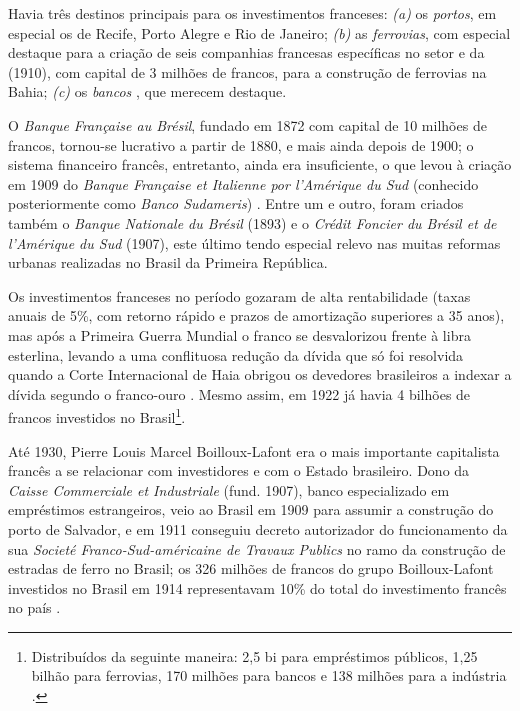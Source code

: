 Havia três destinos principais para os investimentos franceses: \textit{(a)} os \textit{portos}, em especial os de Recife, Porto Alegre e Rio de Janeiro; \textit{(b)} as \textit{ferrovias}, com especial destaque para a criação de seis companhias francesas específicas no setor e da  (1910), com capital de 3 milhões de francos, para a construção de ferrovias na Bahia; \textit{(c)} os \textit{bancos} \cite[p~84]{mauro_empfran_1999}, que merecem destaque.

O \textit{Banque Française au Brésil}, fundado em 1872 com capital de 10 milhões de francos, tornou-se lucrativo a partir de 1880, e mais ainda depois de 1900; o sistema financeiro francês, entretanto, ainda era insuficiente, o que levou à criação em 1909 do \textit{Banque Française et Italienne por l'Amérique du Sud} (conhecido posteriormente como \textit{Banco Sudameris}) \cite[p~84]{mauro_empfran_1999}. Entre um e outro, foram criados também o \textit{Banque Nationale du Brésil} (1893) e o \textit{Crédit Foncier du Brésil et de l'Amérique du Sud} (1907), este último tendo especial relevo nas muitas reformas urbanas realizadas no Brasil da Primeira República.

Os investimentos franceses no período gozaram de alta rentabilidade (taxas anuais de 5\%, com retorno rápido e prazos de amortização superiores a 35 anos), mas após a Primeira Guerra Mundial o franco se desvalorizou frente à libra esterlina, levando a uma conflituosa redução da dívida que só foi resolvida quando a Corte Internacional de Haia obrigou os devedores brasileiros a indexar a dívida segundo o franco-ouro \cite[p.~87]{mauro_empfran_1999}. Mesmo assim, em 1922 já havia 4 bilhões de francos investidos no Brasil\footnote{Distribuídos da seguinte maneira: 2,5 bi para empréstimos públicos, 1,25 bilhão para ferrovias, 170 milhões para bancos e 138 milhões para a indústria \cite[p~84]{mauro_empfran_1999}.}.

Até 1930, Pierre Louis Marcel Boilloux-Lafont era o mais importante capitalista francês a se relacionar com investidores e com o Estado brasileiro. Dono da \textit{Caisse Commerciale et Industriale} (fund. 1907), banco especializado em empréstimos estrangeiros, veio ao Brasil em 1909 para assumir a construção do porto de Salvador, e em 1911 conseguiu decreto autorizador do funcionamento da sua \textit{Societé Franco-Sud-américaine de Travaux Publics} no ramo da construção de estradas de ferro no Brasil; os 326 milhões de francos do grupo Boilloux-Lafont investidos no Brasil em 1914 representavam 10\% do total do investimento francês no país \cite{somogyi_lafont_1990}.

